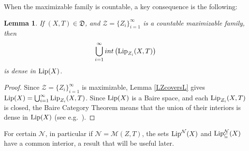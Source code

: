 \documentclass[reqno,11pt]{amsart}
\newtheorem{lem}[thm]{Lemma}
\theoremstyle{definition}
\theoremstyle{remark}
\theoremstyle{remark}
\def\m{\mathcal M}
\def\n{\mathcal N}
\def\lip{{\rm Lip}}
\def\ZZ{\mathcal{Z}}
\def\D{\mathfrak{D}}
\numberwithin{equation}{section}
\begin{document}
When the maximizable family is countable, a key consequence is the following:

\begin{lem}\label{baireconsequence}
If $(X,T)\in\D$,
and $\ZZ=\{Z_i\}_{i=1}^\infty$ is a countable maximizable family, then
$$\bigcup_{i=1}^\infty int\left(\lip_{Z_i}(X,T)\right)$$ is dense in $\lip(X)$.
\end{lem}
\begin{proof}
Since $\ZZ=\{Z_i\}_{i=1}^\infty$ is maximizable,
 Lemma \ref{LZcoversL} gives
$\lip(X) = \bigcup_{i=1}^\infty \lip_{Z_i}(X,T)$.
Since $\lip(X)$ is a Baire space, and each $\lip_{Z_i}(X,T)$ is closed,
 the Baire Category Theorem means that the union of their interiors is dense in $\lip(X)$
(see e.g.~\cite[Thm.~3.34]{AB99}).
\end{proof}








For certain $\n$, in particular
if $\n=\m(Z,T)$, the sets
 $\lip^\n(X)$ and $\lip_\subseteq^\n(X)$ have a common interior, a result that will be useful later.
\end{document}
